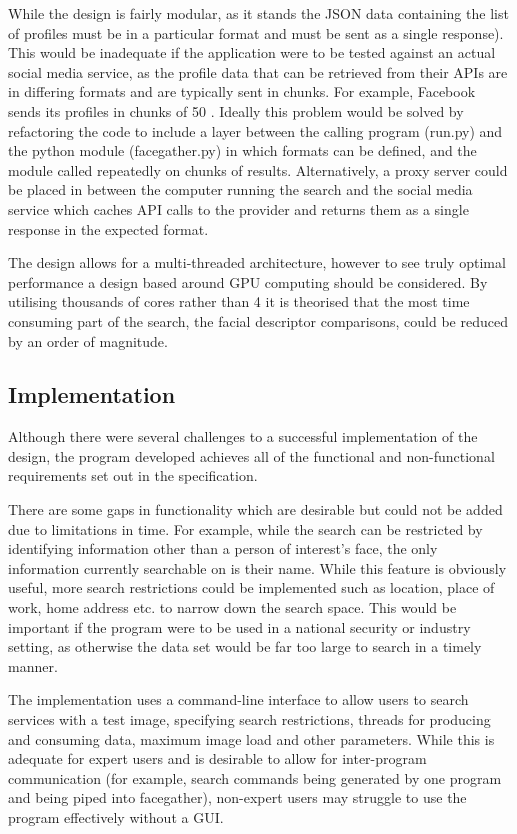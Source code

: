 \documentclass[12pt]{article}
\begin{document}
While the design is fairly modular, as it stands the JSON data containing the list of profiles must be in a particular format and must be sent as a single response). This would be inadequate if the application were to be tested against an actual social media service, as the profile data that can be retrieved from their APIs are in differing formats and are typically sent in chunks. For example, Facebook sends its profiles in chunks of 50 \citep{facebookgraphapi}. Ideally this problem would be solved by refactoring the code to include a layer between the calling program (run.py) and the python module (facegather.py) in which formats can be defined, and the module called repeatedly on chunks of results. Alternatively, a proxy server could be placed in between the computer running the search and the social media service which caches API calls to the provider and returns them as a single response in the expected format.

The design allows for a multi-threaded architecture, however to see truly optimal performance a design based around GPU computing should be considered. By utilising thousands of cores rather than 4 it is theorised that the most time consuming part of the search, the facial descriptor comparisons, could be reduced by an order of magnitude.

\subsection{Implementation}
Although there were several challenges to a successful implementation of the design, the program developed achieves all of the functional and non-functional requirements set out in the specification.

There are some gaps in functionality which are desirable but could not be added due to limitations in time. For example, while the search can be restricted by identifying information other than a person of interest's face, the only information currently searchable on is their name. While this feature is obviously useful, more search restrictions could be implemented such as location, place of work, home address etc. to narrow down the search space. This would be important if the program were to be used in a national security or industry setting, as otherwise the data set would be far too large to search in a timely manner.

The implementation uses a command-line interface to allow users to search services with a test image, specifying search restrictions, threads for producing and consuming data, maximum image load and other parameters. While this is adequate for expert users and is desirable to allow for inter-program communication (for example, search commands being generated by one program and being piped into facegather), non-expert users may struggle to use the program effectively without a GUI.
\end{document}
